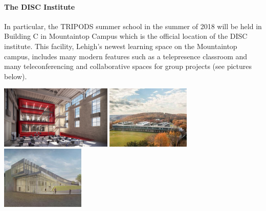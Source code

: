  \paragraph{The DISC Institute} In particular, the TRIPODS summer school in the summer of 2018 will be held in Building C in Mountaintop Campus which is the official location of the DISC institute. This facility, Lehigh's newest learning space on the Mountaintop campus, includes many modern features such as a telepresence
classroom and many teleconferencing and collaborative spaces for group projects (see pictures below).\\
\begin{center}
\includegraphics[height=3cm]{1012131_00_N5_bdc1_HERO.jpeg}
\includegraphics[height=3cm]{Mountaintop-BuildingC}
\includegraphics[height=3cm]{briefs-mountaintop-tech-building-initiative.jpg}
\end{center}


